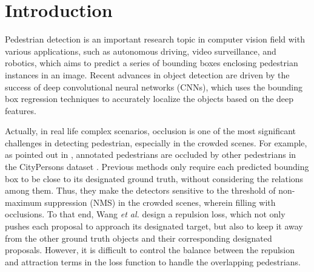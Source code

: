 \documentclass[runningheads]{llncs}
\def\etal{{\em et al. }}
\begin{document}
\section{Introduction}

Pedestrian detection is an important research topic in computer vision field with various applications, such as autonomous driving, video surveillance, and robotics, which aims to predict a series of bounding boxes enclosing pedestrian instances in an image. Recent advances in object detection \cite{DBLP:conf/iccv/Girshick15,DBLP:journals/pami/RenHG017,DBLP:conf/nips/DaiLHS16,DBLP:conf/cvpr/LinDGHHB17,DBLP:confs/cvpr/ZhangSF18,DBLP:journals/corr/abs-1712-02408} are driven by the success of deep convolutional neural networks (CNNs), which uses the bounding box regression techniques to accurately localize the objects based on the deep features.


Actually, in real life complex scenarios, occlusion is one of the most significant challenges in detecting pedestrian, especially in the crowded scenes. For example, as pointed out in \cite{DBLP:journals/corr/abs-1711-07752},  annotated pedestrians are occluded by other pedestrians in the CityPersons dataset \cite{DBLP:conf/cvpr/ZhangBS17}. Previous methods only require each predicted bounding box to be close to its designated ground truth, without considering the relations among them. Thus, they make the detectors sensitive to the threshold of non-maximum suppression (NMS) in the crowded scenes, wherein filling with occlusions. To that end, Wang \etal \cite{DBLP:journals/corr/abs-1711-07752} design a repulsion loss, which not only pushes each proposal to approach its designated target, but also to keep it away from the other ground truth objects and their corresponding designated proposals. However, it is difficult to control the balance between the repulsion and attraction terms in the loss function to handle the overlapping pedestrians.
\end{document}
